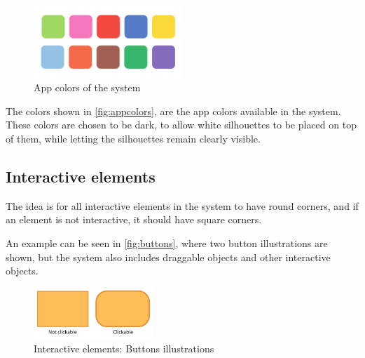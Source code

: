 \begin{figure}[h!]
	\centering
	\includegraphics[width=0.5\textwidth]{gfx/app_colors.pdf}
	\caption{App colors of the \giraf[] system}
	\label{fig:appcolors}
\end{figure}

The colors shown in \autoref{fig:appcolors}, are the app colors available in the \giraf[] system.
These colors are chosen to be dark, to allow white silhouettes to be placed on top of them, while letting the silhouettes remain clearly visible.

\subsection{Interactive elements}
\label{design:button_design}

The idea is for all interactive elements in the \giraf[] system to have round corners, and if an element is not interactive, it should have square corners.

An example can be seen in \autoref{fig:buttons}, where two button illustrations are shown, but the system also includes draggable objects and other interactive objects.

\begin{figure}[h!]
	\centering
	\includegraphics[width=0.4\textwidth]{gfx/buttons.pdf}
	\caption{Interactive elements: Buttons illustrations}
	\label{fig:buttons}
\end{figure}
